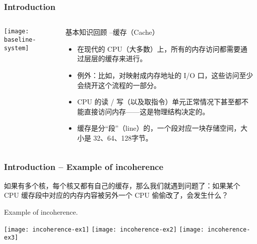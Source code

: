 \begin{frame}[plain]	
	\frametitle{Introduction}
	
	
	\begin{columns}
		
		\begin{column}{.4\textwidth}
			\texttt{[image: baseline-system]}
		\end{column}
		\begin{column}{.6\textwidth}
			基本知识回顾 --缓存（Cache）
			\begin{itemize}
				\item 在现代的 CPU（大多数）上，所有的内存访问都需要通过层层的缓存来进行。
				\item 例外：比如，对映射成内存地址的 I/O 口，这些访问至少会绕开这个流程的一部分。
				\item CPU 的读 / 写（以及取指令）单元正常情况下甚至都不能直接访问内存——这是物理结构决定的。
				\item 缓存是分“段”（line）的，一个段对应一块存储空间，大小是 32、64、128字节。
			\end{itemize}

		\end{column}
	\end{columns}
	
\end{frame}

\begin{frame}[plain]
	\frametitle{Introduction -- Example of incoherence}
   如果有多个核，每个核又都有自己的缓存，那么我们就遇到问题了：如果某个 CPU 缓存段中对应的内存内容被另外一个 CPU 偷偷改了，会发生什么？
	
	Example of incoherence. 
	
	
	\texttt{[image: incoherence-ex1]}
	\texttt{[image: incoherence-ex2]}
	\centering
	\texttt{[image: incoherence-ex3]}
\end{frame}


